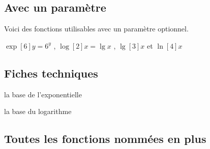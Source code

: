 \documentclass[12pt,a4paper]{article}
\begin{document}


\subsection{Avec un paramètre}

Voici des fonctions utilisables avec un paramètre optionnel.

\begin{latexex}
$\exp[6] y = 6^y$   ,
$\log[2] x = \lg x$ ,
$\lg[3] x$ et $\ln[4] x$
\end{latexex}




\subsection{Fiches techniques}



\IDoption{} la base de l'exponentielle

\separation




\IDoption{} la base du logarithme





\subsection{Toutes les fonctions nommées en plus} \label{tnsana-all-named-functions}

\vspace{-1em}
\end{document}
